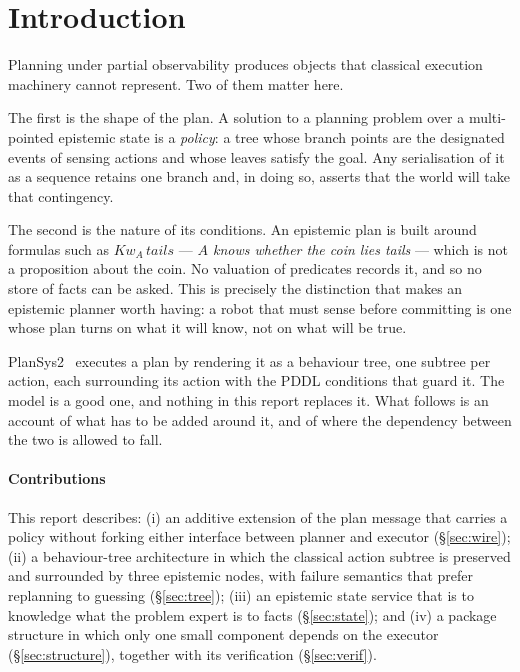 \documentclass[11pt,a4paper]{article}
\theoremstyle{definition}
\newcommand{\Kw}[1]{\mathit{Kw}_{#1}}
\begin{document}
\tableofcontents
\newpage

\section{Introduction}

Planning under partial observability produces objects that classical execution
machinery cannot represent. Two of them matter here.

The first is the shape of the plan. A solution to a planning problem over a
multi-pointed epistemic state is a \emph{policy}: a tree whose branch points are
the designated events of sensing actions and whose leaves satisfy the goal. Any
serialisation of it as a sequence retains one branch and, in doing so, asserts
that the world will take that contingency.

The second is the nature of its conditions. An epistemic plan is built around
formulas such as $\Kw{A}\,\mathit{tails}$ --- \emph{$A$ knows whether the coin
lies tails} --- which is not a proposition about the coin. No valuation of
predicates records it, and so no store of facts can be asked. This is precisely
the distinction that makes an epistemic planner worth having: a robot that must
sense before committing is one whose plan turns on what it will know, not on
what will be true.

PlanSys2~\cite{plansys2} executes a plan by rendering it as a behaviour tree,
one subtree per action, each surrounding its action with the PDDL conditions
that guard it. The model is a good one, and nothing in this report replaces it.
What follows is an account of what has to be added around it, and of where the
dependency between the two is allowed to fall.

\paragraph{Contributions} This report describes: (i) an additive extension of
the plan message that carries a policy without forking either interface between
planner and executor (\S\ref{sec:wire}); (ii) a behaviour-tree architecture in
which the classical action subtree is preserved and surrounded by three
epistemic nodes, with failure semantics that prefer replanning to guessing
(\S\ref{sec:tree}); (iii) an epistemic state service that is to knowledge what
the problem expert is to facts (\S\ref{sec:state}); and (iv) a package structure
in which only one small component depends on the executor
(\S\ref{sec:structure}), together with its verification (\S\ref{sec:verif}).
\end{document}

